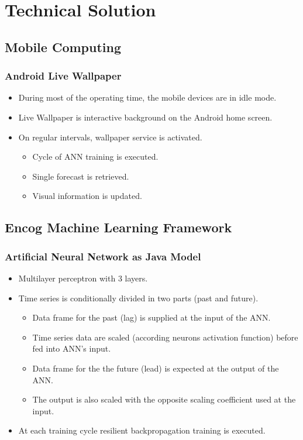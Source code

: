 \documentclass{beamer}
\begin{document}
\section{Technical Solution}

\subsection{Mobile Computing}

\begin{frame}
\frametitle{Android Live Wallpaper}
\begin{itemize}
  \item During most of the operating time, the mobile devices are in idle mode.
  \item Live Wallpaper is interactive background on the Android home screen.
  \item On regular intervals, wallpaper service is activated.
  \begin{itemize}
    \item Cycle of ANN training is executed.
    \item Single forecast is retrieved.
    \item Visual information is updated.
  \end{itemize}
\end{itemize}
\end{frame}

\subsection{Encog Machine Learning Framework}

\begin{frame}
\frametitle{Artificial Neural Network as Java Model}
\begin{itemize}
  \item Multilayer perceptron with 3 layers.
  \item Time series is conditionally divided in two parts (past and future).
  \begin{itemize}
    \item Data frame for the past (lag) is supplied at the input of the ANN.
    \item Time series data are scaled (according neurons activation function) before fed into ANN's input.
    \item Data frame for the the future (lead) is expected at the output of the ANN.
    \item The output is also scaled with the opposite scaling coefficient used at the input.
  \end{itemize}
  \item At each training cycle resilient backpropagation training is executed.
\end{itemize}
\end{frame}
\end{document}
